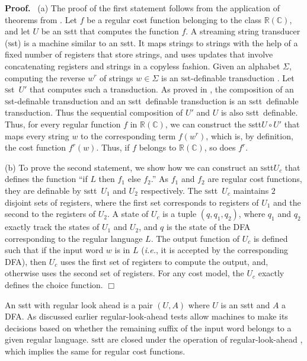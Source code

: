 \documentclass[11pt]{article}
\def\Proof{{\bf Proof.}}
\def\qed{{\bf $\Box$}}
\def\qed{{\bf $\Box$}}
\newcommand{\reg}[1]{{\mathbb R}(#1)}
\newcommand{\CostModel}{\ensuremath{\mathbb{C}}}
\newcommand{\SST}{{\sc\textsc sst}}
\newcommand{\SSTT}{{\sc\textsc sstt}\xspace}
\newcommand{\stt}{\ensuremath{U}}
\newcommand{\ie}{{\em i.e.}\xspace}
\begin{document}
\Proof~ (a) The proof of the first statement follows from the
application of theorems from
\cite{alur_expressiveness_2010,alur_stt_2011}.  Let $f$ be a regular
cost function belonging to the class $\reg{\CostModel}$, and let
$\stt$ be an \SSTT that computes the function $f$. A streaming string
transducer (\SST) is a machine similar to an \SSTT. It maps strings to
strings with the help of a fixed number of registers that store
strings, and uses updates that involve concatenating registers and
strings in a copyless fashion.  Given an alphabet $\Sigma$, computing
the reverse $w^r$ of strings $w\in \Sigma$ is an \SST-definable
transduction \cite{alur_expressiveness_2010}.  Let \SST~$\stt'$ that
computes such a transduction. As proved in \cite{alur_stt_2011}, the
composition of an \SST-definable transduction and an \SSTT~definable
transduction is an \SSTT~definable transduction.  Thus the sequential
composition of $\stt'$ and $\stt$ is also \SSTT~definable. Thus, for
every regular function $f$ in $\reg{\CostModel}$, we can construct the
\SSTT $\stt \circ \stt'$ that maps every string $w$ to the
corresponding term $f(w^r)$, which is, by definition, the cost
function $f^r(w)$.   Thus, if $f$ belongs to $\reg{\CostModel}$, so
does $f^r$.

(b) To prove the second statement, we show how we can construct an
\SSTT $\stt_c$ that defines the function ``if $L$ then $f_1$ else
$f_2$.''  As $f_1$ and $f_2$ are regular cost functions, they are
definable by \SSTT~$\stt_1$ and $\stt_2$ respectively. The
\SSTT~$\stt_c$ maintains $2$ disjoint sets of registers, where the
first set corresponds to registers of $\stt_1$ and the second to the
registers of $\stt_2$. A state of $\stt_c$ is a tuple $(q,q_1,q_2)$,
where $q_1$ and $q_2$ exactly track the states of $\stt_1$ and
$\stt_2$, and $q$ is the state of the DFA corresponding to the regular
language $L$. The output function of $\stt_c$ is defined such that if
the input word $w$ is in $L$ (\ie, it is accepted by the corresponding
DFA), then $\stt_c$ uses the first set of registers to compute the
output, and, otherwise uses the second set of registers.  For any cost
model, the $\stt_c$ exactly defines the choice function.  \qed

An \SSTT with regular look ahead is a pair $(\stt,A)$ where $\stt$ is
an \SSTT and $A$ a DFA.  As discussed earlier regular-look-ahead tests
allow machines to make its decisions based on whether the remaining
suffix of the input word belongs to a given regular language.  \SSTT
are closed under the operation of regular-look-ahead
\cite{alur_stt_2011}, which implies the same for regular cost
functions.
\end{document}
